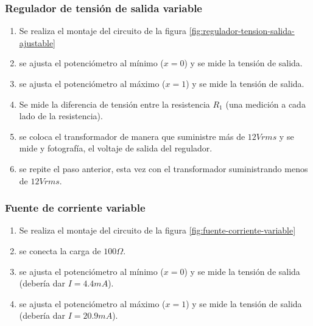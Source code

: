 \subsubsection{Regulador de tensión de salida variable}

\begin{enumerate}
    \item Se realiza el montaje del circuito de la figura \ref{fig:regulador-tension-salida-ajustable}
    \item se ajusta el potenciómetro al mínimo ($x = 0$) y se mide la tensión de salida.
    \item se ajusta el potenciómetro al máximo ($x = 1$) y se mide la tensión de salida.
    \item Se mide la diferencia de tensión entre la resistencia $R_1$ (una medición a cada lado de la resistencia).
    \item se coloca el transformador de manera que suministre más de $12Vrms$ y se mide y fotografía, el voltaje de salida del regulador.
    \item se repite el paso anterior, esta vez con el transformador suministrando menos de $12Vrms$.
\end{enumerate}

\subsubsection{Fuente de corriente variable}

\begin{enumerate}
    \item Se realiza el montaje del circuito de la figura \ref{fig:fuente-corriente-variable}
    \item se conecta la carga de $100 \Omega$.
    \item se ajusta el potenciómetro al mínimo ($x = 0$) y se mide la tensión de salida (debería dar $I= 4.4 mA$).
    \item se ajusta el potenciómetro al máximo ($x = 1$) y se mide la tensión de salida (debería dar $I= 20.9 mA$).
\end{enumerate}